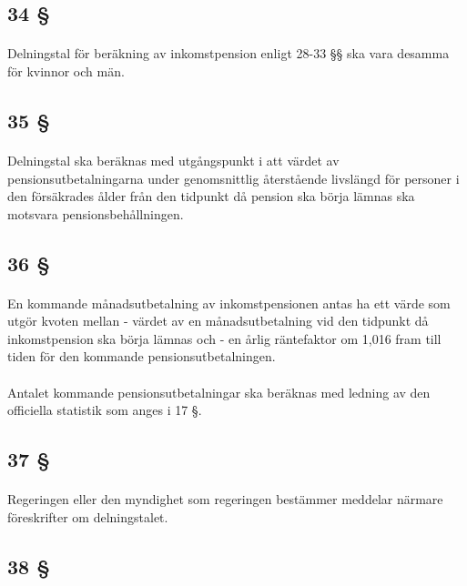 \documentclass[a4paper,notitlepage,openany,10pt]{book}
\begin{document}
\subsection*{34 §}
\paragraph*{}
Delningstal för beräkning av inkomstpension enligt 28-33 §§ ska vara desamma för kvinnor och män.
\subsection*{35 §}
\paragraph*{}
Delningstal ska beräknas med utgångspunkt i att värdet av pensionsutbetalningarna under genomsnittlig återstående livslängd för personer i den försäkrades ålder från den tidpunkt då pension ska börja lämnas ska motsvara pensionsbehållningen.
\subsection*{36 §}
\paragraph*{}
En kommande månadsutbetalning av inkomstpensionen antas ha ett värde som utgör kvoten mellan
\newline - värdet av en månadsutbetalning vid den tidpunkt då inkomstpension ska börja lämnas och
\newline - en årlig räntefaktor om 1,016 fram till tiden för den kommande pensionsutbetalningen.
\paragraph*{}
Antalet kommande pensionsutbetalningar ska beräknas med ledning av den officiella statistik som anges i 17 §.
\subsection*{37 §}
\paragraph*{}
Regeringen eller den myndighet som regeringen bestämmer meddelar närmare föreskrifter om delningstalet.
\subsection*{38 §}
\end{document}
